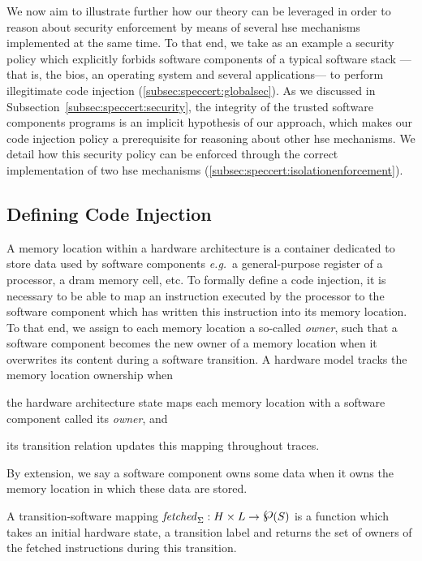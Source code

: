 We now aim to illustrate further how our theory can be leveraged in order to
reason about security enforcement by means of several \ac{hse} mechanisms
implemented at the same time.
%
To that end, we take as an example a security policy which explicitly forbids
software components of a typical software stack ---that is, the \ac{bios}, an
operating system and several applications--- to perform illegitimate code
injection (\ref{subsec:speccert:globalsec}).
%
As we discussed in Subsection~\ref{subsec:speccert:security}, the integrity of
the trusted software components programs is an implicit hypothesis of our
approach, which makes our code injection policy a prerequisite for reasoning
about other \ac{hse} mechanisms.
%
We detail how this security policy can be enforced through the correct
implementation of two \ac{hse} mechanisms
(\ref{subsec:speccert:isolationenforcement}).

\subsection{Defining Code Injection}
\label{subsec:speccert:tampering}

A memory location within a hardware architecture is a container dedicated to
store data used by software components \emph{e.g.}~a general-purpose register of
a processor, a \ac{dram} memory cell, etc.
%
To formally define a code injection, it is necessary to be able to map an
instruction executed by the processor to the software component which has
written this instruction into its memory location.
%
To that end, we assign to each memory location a so-called \emph{owner}, such
that a software component becomes the new owner of a memory location when it
overwrites its content during a software transition.
%
A hardware model tracks the memory location ownership when
%
\begin{inparaenum}[(1)]
\item the hardware architecture state maps each memory location with a software
  component called its \emph{owner}, and
%
\item its transition relation updates this mapping throughout traces.
\end{inparaenum}
%
By extension, we say a software component owns some data when it owns the memory
location in which these data are stored.

\begin{definition}
  \label{def:speccert:transsoft}
  A transition-software mapping
  $\func{fetched}_{\Sigma}: H \times L \rightarrow \powerset(S)$ is a function
  which takes an initial hardware state, a transition label and returns the set
  of owners of the fetched instructions during this transition. 
\end{definition}

